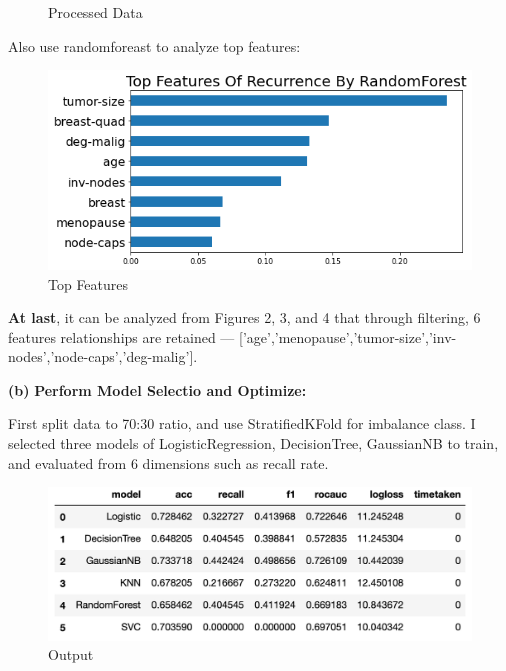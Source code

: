 \documentclass[11pt]{article}
\renewcommand\part[1]{\vspace{.10in}\textbf{(#1)}}
\newcommand\ot{\vspace{.10in}\textbf{Perform Model Selectio and Optimize: }}
\begin{document}
\begin{figure}[H]
    \caption{Processed Data}
\end{figure}

Also use randomforeast to analyze top features:
\begin{figure}[H]
    \centering
    \includegraphics[width=1\textwidth]{Fig5}
    \caption{Top Features}
\end{figure}

\textbf{At last}, it can be analyzed from Figures 2, 3, and 4 that through filtering, 6 features relationships are retained --- ['age','menopause','tumor-size','inv-nodes','node-caps','deg-malig'].


\part{b} \ot

First split data to 70:30 ratio, and use StratifiedKFold for imbalance class. I selected three models of LogisticRegression, DecisionTree, GaussianNB to train, and evaluated from 6 dimensions such as recall rate.
\begin{figure}[H]
    \centering
    \includegraphics[width=1\textwidth]{Fig9}
    \caption{Output}
\end{figure}
\end{document}
